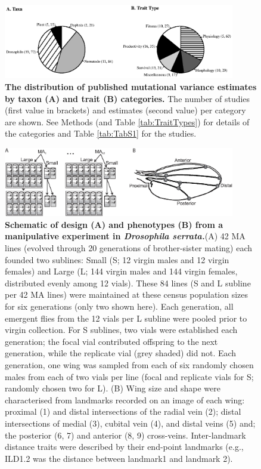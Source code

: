\begin{figure}[!h]
\centering
\includegraphics[width=0.9\textwidth]{Chp2_Meta/Fig1Pies_3.02.22.eps}
\caption[The distribution of published mutational variance estimates by taxon (A) and trait (B) categories.]{\textbf{The distribution of published mutational variance estimates by taxon (A) and trait (B) categories.} The number of studies (first value in brackets) and estimates (second value) per category are shown. See Methods (and Table \ref{tab:TraitTypes}) for details of the categories and Table \ref{tab:TabS1} for the studies.} 
\label{fig:Pies}
\end{figure}

\newpage
\FloatBarrier
\begin{figure}
    \centering
    \includegraphics[width=0.9\textwidth]{Chp2_Meta/Fig2.MAdesign.eps}
    \caption[Schematic of design (A) and phenotypes (B) from a manipulative experiment in \textit{Drosophila serrata.} ]{\textbf{Schematic of design (A) and phenotypes (B) from a manipulative experiment in \textit{Drosophila serrata.}}(A) 42 MA lines (evolved through 20 generations of brother-sister mating) each founded two sublines: Small (S; 12 virgin males and 12 virgin females) and Large (L; 144 virgin males and 144 virgin females, distributed evenly among 12 vials). These 84 lines (S and L subline per 42 MA lines) were maintained at these census population sizes for six generations (only two shown here). Each generation, all emergent flies from the 12 vials per L subline were pooled prior to virgin collection. For S sublines, two vials were established each generation; the focal vial contributed offspring to the next generation, while the replicate vial (grey shaded) did not. Each generation, one wing was sampled from each of six randomly chosen males from each of two vials per line (focal and replicate vials for S; randomly chosen two for L). (B) Wing size and shape were characterised from landmarks recorded on an image of each wing: proximal (1) and distal intersections of the radial vein (2); distal intersections of medial (3), cubital vein (4), and distal veins (5) and; the posterior (6, 7) and anterior (8, 9) cross-veins. Inter-landmark distance traits were described by their end-point landmarks (e.g., ILD1.2 was the distance between landmark1 and landmark 2).}
    \label{fig:Fig2MetMRdsgn}
\end{figure}

